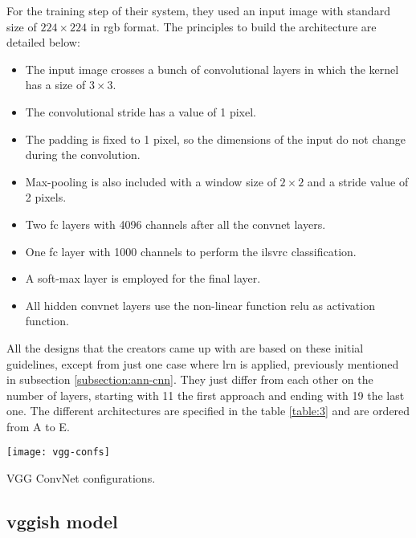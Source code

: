 	For the training step of their system, they used an input image with standard size of $224 \times 224$ in \acrshort{rgb} format. The principles to build the architecture are detailed below:
	
	\begin{itemize}
		\item The input image crosses a bunch of convolutional layers in which the kernel has a size of $3 \times 3$.
		\item The convolutional stride has a value of 1 pixel.
		\item The padding is fixed to 1 pixel, so the dimensions of the input do not change during the convolution.
		\item Max-pooling is also included with a window size of $2 \times 2$ and a stride value of 2 pixels.
		\item Two \acrfull{fc} layers with 4096 channels after all the \acrlong{convnet} layers.
		\item One \acrshort{fc} layer with 1000 channels to perform the \acrshort{ilsvrc} classification.
		\item A soft-max layer is employed for the final layer.
		\item All hidden \acrlong{convnet} layers use the non-linear function \acrshort{relu} as activation function.
	\end{itemize}
	
	All the designs that the creators came up with are based on these initial guidelines, except from just one case where \acrfull{lrn} is applied, previously mentioned in subsection \ref{subsection:ann-cnn}. They just differ from each other on the number of layers, starting with 11 the first approach and ending with 19 the last one. The different architectures are specified in the table \ref{table:3} \cite{Simonyan2015} and are ordered from A to E.
	
	\begin{table}[t!]
		\begin{center}
			\captionsetup{justification=centering}
			\texttt{[image: vgg-confs]}
			\caption{VGG ConvNet configurations.}
			\label{table:3}
		\end{center}
	\end{table}

\subsection{\acrshort{vgg}ish model}
\label{subsection:vggish}

